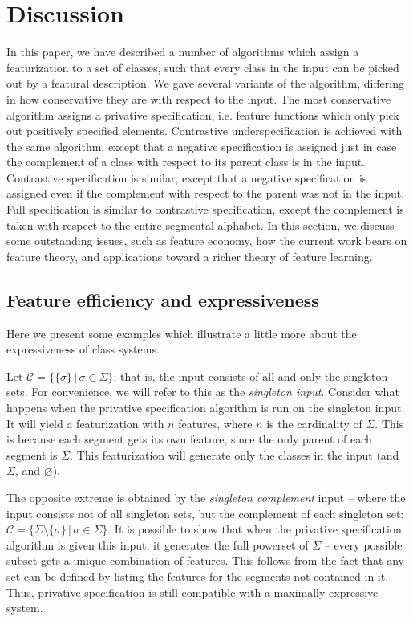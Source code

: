 \documentclass[11pt, oneside]{article}   	%
\begin{document}
\FloatBarrier
\section{Discussion}
\label{sec:discussion}

In this paper, we have described a number of algorithms which assign a featurization to a set of classes, such that every class in the input can be picked out by a featural description. We gave several variants of the algorithm, differing in how conservative they are with respect to the input. The most conservative algorithm assigns a privative specification, i.e. feature functions which only pick out positively specified elements. Contrastive underspecification is achieved with the same algorithm, except that a negative specification is assigned just in case the complement of a class with respect to its parent class is in the input. Contrastive specification is similar, except that a negative specification is assigned even if the complement with respect to the parent was not in the input. Full specification is similar to contrastive specification, except the complement is taken with respect to the entire segmental alphabet. In this section, we discuss some outstanding issues, such as feature economy, how the current work bears on feature theory, and applications toward a richer theory of feature learning.

\subsection{Feature efficiency and expressiveness}

Here we present some examples which illustrate a little more about the expressiveness of class systems.

Let $\mathcal C = \{ \{\sigma\} \, | \, \sigma \in \Sigma \}$; that is, the input consists of all and only the singleton sets. For convenience, we will refer to this as the \textit{singleton input}. Consider what happens when the privative specification algorithm is run on the singleton input. It will yield a featurization with $n$ features, where $n$ is the cardinality of $\Sigma$. This is because each segment gets its own feature, since the only parent of each segment is $\Sigma$. This featurization will generate only the classes in the input (and $\Sigma$, and $\varnothing$).

The opposite extreme is obtained by the \textit{singleton complement} input -- where the input consists not of all singleton sets, but the complement of each singleton set:  $\mathcal C = \{ \Sigma \setminus \{\sigma\} \, | \, \sigma \in \Sigma \}$. It is possible to show that when the privative specification algorithm is given this input, it generates the full powerset of $\Sigma$ -- every possible subset gets a unique combination of features. This follows from the fact that any set can be defined by listing the features for the segments not contained in it. Thus, privative specification is still compatible with a maximally expressive system.
\end{document}
